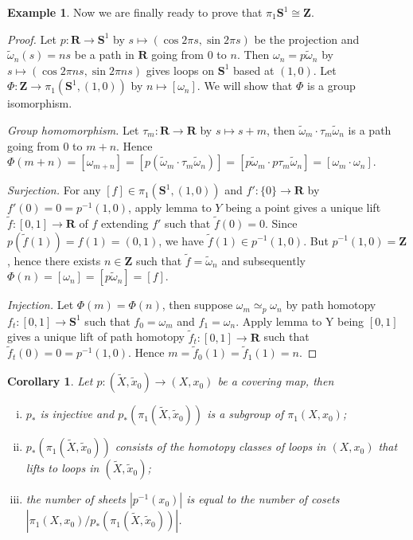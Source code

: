 \documentclass[11pt]{article}
\theoremstyle{definition}
\newtheorem*{example}{Example}
\theoremstyle{plain}
\newtheorem*{corollary}{Corollary}
\theoremstyle{remark}
\newcommand{\R}{\mathbf{R}}
\newcommand{\Z}{\mathbf{Z}}
\begin{document}
\begin{example}
Now we are finally ready to prove that $\pi_1\mathbf{S}^1\cong\Z$.
\begin{proof}
Let $p:\R\to\mathbf{S}^1$ by $s\mapsto(\cos2\pi s,\sin2\pi s)$ be the projection and $\widetilde{\omega}_n(s)=ns$ be a path in $\R$ going from $0$ to $n$. Then $\omega_n=p\widetilde{\omega}_n$ by $s\mapsto(\cos2\pi ns,\sin2\pi ns)$ gives loops on $\mathbf{S}^1$ based at $(1,0)$. Let $\Phi:\Z\to\pi_1(\mathbf{S}^1,(1,0))$ by $n\mapsto[\omega_n]$. We will show that $\Phi$ is a group isomorphism.\medbreak

\textit{Group homomorphism.} Let $\tau_m:\R\to\R$ by $s\mapsto s+m$, then $\widetilde{\omega}_m\cdot\tau_m\widetilde{\omega}_n$ is a path going from $0$ to $m+n$. Hence $\Phi(m+n)=[\omega_{m+n}]=[p(\widetilde{\omega}_m\cdot\tau_m\widetilde{\omega}_n)]=[p\widetilde{\omega}_m\cdot p\tau_m\widetilde{\omega}_n]=[\omega_m\cdot\omega_n]$.\medbreak

\textit{Surjection.} For any $[f]\in\pi_1(\mathbf{S}^1,(1,0))$ and $f':\{0\}\to\R$ by $f'(0)=0=p^{-1}(1,0)$, apply lemma to $Y$ being a point gives a unique lift $\widetilde{f}:[0,1]\to\R$ of $f$ extending $f'$ such that $\widetilde{f}(0)=0$. Since $p(\widetilde{f}(1))=f(1)=(0,1)$, we have $\widetilde{f}(1)\in p^{-1}(1,0)$. But $p^{-1}(1,0)=\Z$, hence there exists $n\in\Z$ such that $\widetilde{f}=\widetilde{\omega}_n$ and subsequently $\Phi(n)=[\omega_n]=[p\widetilde{\omega}_n]=[f]$.\medbreak

\textit{Injection. }Let $\Phi(m)=\Phi(n)$, then suppose $\omega_m\simeq_p\omega_n$ by path homotopy $f_t:[0,1]\to\mathbf{S}^1$ such that $f_0=\omega_m$ and $f_1=\omega_n$. Apply lemma to Y being $[0,1]$ gives a unique lift of path homotopy $\widetilde{f}_t:[0,1]\to\R$ such that $\widetilde{f}_t(0)=0=p^{-1}(1,0)$. Hence $m=\widetilde{f}_0(1)=\widetilde{f}_1(1)=n$.
\end{proof}
\end{example}

\begin{corollary}
Let $p:(\widetilde{X},\widetilde{x}_0)\to(X,x_0)$ be a covering map, then\begin{enumerate}[(i)]
    \item $p_\ast$ is injective and $p_\ast(\pi_1(\widetilde{X},\widetilde{x}_0))$ is a subgroup of $\pi_1(X,x_0)$;
    \item $p_\ast(\pi_1(\widetilde{X},\widetilde{x}_0))$ consists of the homotopy classes of loops in $(X,x_0)$ that lifts to loops in $(\widetilde{X},\widetilde{x}_0)$;
    \item the number of sheets $|p^{-1}(x_0)|$ is equal to the number of cosets $|\pi_1(X,x_0)/p_\ast(\pi_1(\widetilde{X},\widetilde{x}_0))|$.
\end{enumerate}
\end{corollary}
\end{document}
